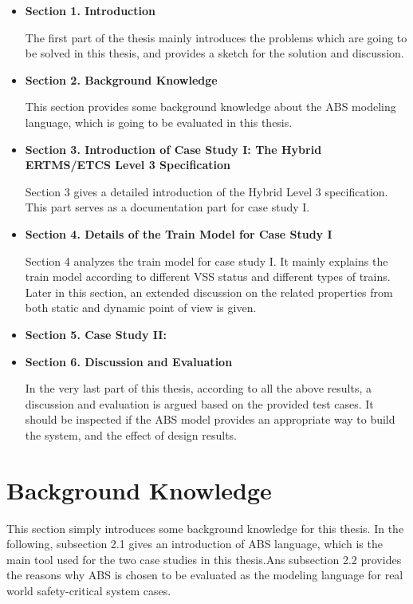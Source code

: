 \documentclass[article,dr=phil,type=drfinal,colorback,accentcolor=tud9c]{tudthesis}
\begin{document}
  \begin{itemize}
  	
  	\item \textbf{Section 1. Introduction}
  	
  	The first part of the thesis mainly introduces the problems which are going to be solved in this thesis, and provides a sketch for the solution and discussion. 
  	
  	\item \textbf{Section 2. Background Knowledge}
  	
  	This section provides some background knowledge about the ABS modeling language, which is going to be evaluated in this thesis.
  	
  	\item \textbf{Section 3. Introduction of Case Study I: The Hybrid ERTMS/ETCS Level 3 Specification}
  	
  	Section 3 gives a detailed introduction of the Hybrid Level 3 specification. This part serves as a documentation part for case study I.
  	
  	\item \textbf{Section 4. Details of the Train Model for Case Study I}
  	
  	Section 4 analyzes the train model for case study I. It mainly explains the train model according to different VSS status and different types of trains. Later in this section, an extended discussion on the related properties from both static and dynamic point of view is given. 
  	
  	\item \textbf{Section 5. Case Study II:}
  	
  	\item \textbf{Section 6. Discussion and Evaluation}
  	
  	In the very last part of this thesis, according to all the above results, a discussion and evaluation is argued based on the provided test cases. It should be inspected if the ABS model provides an appropriate way to build the system, and the effect of design results.
  
  \end{itemize}	

  
  \section{Background Knowledge}
  
  This section simply introduces some background knowledge for this thesis. In the following, subsection 2.1 gives an introduction of ABS language, which is the main tool used for the two case studies in this thesis.Ans subsection 2.2 provides the reasons why ABS is chosen to be evaluated as the modeling language for real world safety-critical system cases.
  
\end{document}
